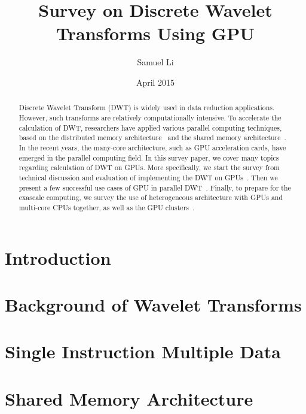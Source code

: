 \documentclass{article}
\title{Survey on Discrete Wavelet Transforms Using GPU}
\author{Samuel Li}
\date{April 2015}
\begin{document}
\onehalfspacing

\maketitle

\begin{abstract}
Discrete Wavelet Transform (DWT) is widely used in data reduction applications.
%
However, such transforms are relatively computationally intensive.
%
To accelerate the calculation of DWT, researchers have applied various parallel
computing techniques, based on the distributed memory architecture~\cite{
chadha2002scalable, woo1995parallel, uhl1996wavelet, nielsen1997scalable}
and the shared memory architecture~\cite{
kutil1999hardware,lucka2000parallel}.
%
In the recent years, the many-core architecture, such as GPU acceleration 
cards, have emerged in the parallel computing field.
%
In this survey paper, we cover many topics regarding calculation of DWT on GPUs.
%
More specifically, we start the survey from technical discussion and evaluation
of implementing the DWT on GPUs~\cite{tenllado2008parallel, van2011accelerating,
garcia2005gpu}.
%
Then we present a few successful use cases of GPU in parallel DWT~\cite{
strengert2004hierarchical, strengert2006pyramid, wong2007discrete,
treib2012turbulence}.
%
Finally, to prepare for the exascale computing, we survey the use of 
heterogeneous architecture with GPUs and multi-core CPUs together,
as well as the GPU clusters~\cite{franco2009parallel, franco2010parallel,
strengert2005large, franco20122d, rossinelli2011multicore}.
%
\end{abstract}

\section{Introduction}

\section{Background of Wavelet Transforms}

\label{sec:bg}

\section{Single Instruction Multiple Data}

\label{sec:simd}

\section{Shared Memory Architecture}

\label{sec:sma}

 
%

\end{document}
